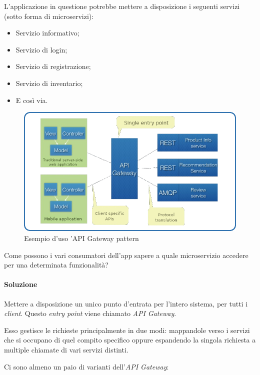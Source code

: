 L'applicazione in questione potrebbe mettere a disposizione i seguenti servizi (sotto forma di microservizi):
\begin{itemize}[noitemsep]
	\item Servizio informativo;
	\item Servizio di login;
	\item Servizio di registrazione;
	\item Servizio di inventario;
	\item E così via.
\end{itemize}

\begin{figure}[H]
	\centering
	\includegraphics[width=\textwidth]{immagini/apigateway.png}
	\caption[Esempio d'uso API Gateway]{Esempio d'uso 'API Gateway pattern\footnotemark}
	\label{fig:api-gateway}
\end{figure}

Come possono i vari consumatori dell'app sapere a quale \gls{microservizio} accedere per una determinata funzionalità?

\paragraph*{Soluzione} Mettere a disposizione un unico punto d'entrata per l'intero sistema, per tutti i \textit{client}.
Questo \textit{entry point} viene chiamato \textit{API Gateway}.

Esso gestisce le richieste principalmente in due modi:
mappandole verso i servizi che si occupano di quel compito specifico oppure espandendo la singola richiesta a multiple chiamate di vari servizi distinti.

Ci sono almeno un paio di varianti dell'\textit{API Gateway}:

